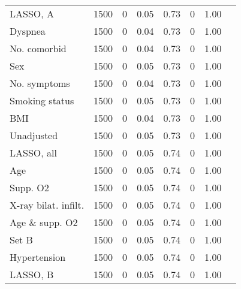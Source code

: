 \documentclass{article}
\begin{document}
{\begin{longtable}{lccccccc}
LASSO, A & 1500 & 0 & 0.05 & 0.73 & 0 & 1.00\\
Dyspnea & 1500 & 0 & 0.04 & 0.73 & 0 & 1.00\\
No. comorbid & 1500 & 0 & 0.04 & 0.73 & 0 & 1.00\\
Sex & 1500 & 0 & 0.05 & 0.73 & 0 & 1.00\\
No. symptoms & 1500 & 0 & 0.04 & 0.73 & 0 & 1.00\\
Smoking status & 1500 & 0 & 0.05 & 0.73 & 0 & 1.00\\
BMI & 1500 & 0 & 0.04 & 0.73 & 0 & 1.00\\
Unadjusted & 1500 & 0 & 0.05 & 0.73 & 0 & 1.00\\
LASSO, all & 1500 & 0 & 0.05 & 0.74 & 0 & 1.00\\
Age & 1500 & 0 & 0.05 & 0.74 & 0 & 1.00\\
Supp. O2 & 1500 & 0 & 0.05 & 0.74 & 0 & 1.00\\
X-ray bilat. infilt. & 1500 & 0 & 0.05 & 0.74 & 0 & 1.00\\
Age \& supp. O2 & 1500 & 0 & 0.05 & 0.74 & 0 & 1.00\\
Set B & 1500 & 0 & 0.05 & 0.74 & 0 & 1.00\\
Hypertension & 1500 & 0 & 0.05 & 0.74 & 0 & 1.00\\
LASSO, B & 1500 & 0 & 0.05 & 0.74 & 0 & 1.00\\
\bottomrule
\hline
\end{longtable}
}

\clearpage
\end{document}
